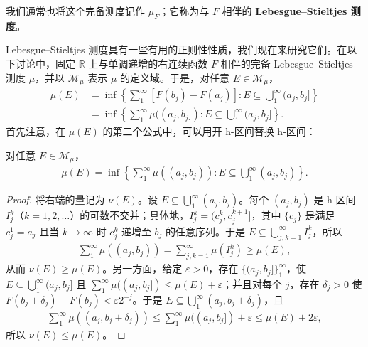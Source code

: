 \documentclass[../../main.tex]{subfiles}%
\begin{document}
\begin{definition}\label{definition:ch01-lebesgue-stieltjes-measure}
我们通常也将这个完备测度记作 $\mu_F$；它称为与 $F$ 相伴的 \textbf{Lebesgue–Stieltjes 测度}。
\end{definition}


Lebesgue–Stieltjes 测度具有一些有用的正则性性质，我们现在来研究它们。在以下讨论中，固定 $\mathbb{R}$ 上与单调递增的右连续函数 $F$ 相伴的完备 Lebesgue–Stieltjes 测度 $\mu$，并以 $\mathscr{M}_\mu$ 表示 $\mu$ 的定义域。于是，对任意 $E\in\mathscr{M}_\mu$，
\begin{align*}
\mu(E)&=\inf\left\{\sum_1^\infty[F(b_j)-F(a_j)]:E\subseteq\bigcup_1^\infty(a_j,b_j]\right\}\\
&=\inf\left\{\sum_1^\infty\mu((a_j,b_j]):E\subseteq\bigcup_1^\infty(a_j,b_j]\right\}.
\end{align*}
首先注意，在 $\mu(E)$ 的第二个公式中，可以用开 h-区间替换 h-区间：

\begin{lemma}\label{lemma:ch01-stieltjes-open-cover}
对任意 $E\in\mathscr{M}_\mu$，
\begin{align*}
\mu(E)=\inf\left\{\sum_1^\infty\mu((a_j,b_j)):E\subseteq\bigcup_1^\infty(a_j,b_j)\right\}.
\end{align*}
\end{lemma}

\begin{proof}
将右端的量记为 $\nu(E)$。设 $E\subseteq\bigcup_1^\infty(a_j,b_j)$。每个 $(a_j,b_j)$ 是 h-区间 $I_j^k$（$k=1,2,\ldots$）的可数不交并；具体地，$I_j^k=(c_j^k,c_j^{k+1}]$，其中 $\{c_j\}$ 是满足 $c_j^1=a_j$ 且当 $k\to\infty$ 时 $c_j^k$ 递增至 $b_j$ 的任意序列。于是 $E\subseteq\bigcup_{j,k=1}^\infty I_j^k$，所以
\begin{align*}
\sum_1^\infty\mu((a_j,b_j))=\sum_{j,k=1}^\infty\mu(I_j^k)\geqslant\mu(E),
\end{align*}
从而 $\nu(E)\geqslant\mu(E)$。另一方面，给定 $\varepsilon>0$，存在 $\{(a_j,b_j]\}_1^\infty$，使 $E\subseteq\bigcup_1^\infty(a_j,b_j]$ 且 $\sum_1^\infty\mu((a_j,b_j])\leqslant\mu(E)+\varepsilon$；并且对每个 $j$，存在 $\delta_j>0$ 使 $F(b_j+\delta_j)-F(b_j)<\varepsilon2^{-j}$。于是 $E\subseteq\bigcup_1^\infty(a_j,b_j+\delta_j)$，且
\begin{align*}
\sum_1^\infty\mu((a_j,b_j+\delta_j))\leqslant\sum_1^\infty\mu((a_j,b_j])+\varepsilon\leqslant\mu(E)+2\varepsilon,
\end{align*}
所以 $\nu(E)\leqslant\mu(E)$。
\end{proof}
\end{document}
